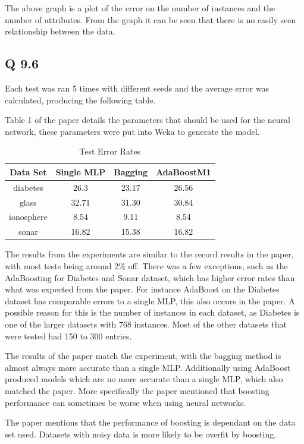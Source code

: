The above graph is a plot of the error on the number of instances and the number of attributes.
From the graph it can be seen that there is no easily seen relationship between the data.

\subsection*{Q 9.6}

Each test was ran 5 times with different seeds and the average error was calculated, producing the following table.

Table 1 of the paper details the parameters that should be used for the neural network,
these parameters were put into Weka to generate the model.

\begin{table}[H]
\centering
\caption{Test Error Rates}
\begin{tabular}{|c|c|c|c|}
\hline
Data Set & Single MLP & Bagging & AdaBoostM1 \\
\hline
diabetes & 26.3 & 23.17 & 26.56 \\
glass & 32.71 & 31.30 & 30.84 \\
ionosphere & 8.54 & 9.11 & 8.54 \\
sonar & 16.82 & 15.38 & 16.82 \\
\hline
\end{tabular}
\end{table}

The results from the experiments are similar to the record results in the paper, with most tests being around 2\% off.
There was a few exceptions, such as the AdaBoosting for Diabetes and Sonar dataset,
which has higher error rates than what was expected from the paper.
For instance AdaBoost on the Diabetes dataset has comparable errors to a single MLP, this also occurs in the paper.
A possible reason for this is the number of instances in each dataset, as Diabetes is one of the larger datasets
with 768 instances.
Most of the other datasets that were tested had 150 to 300 entries.

The results of the paper match the experiment, with the bagging method is almost always more accurate than a single MLP.
Additionally using AdaBoost produced models which are no more accurate than a single MLP, which also matched the paper.
More specifically the paper mentioned that boosting performance can sometimes be worse when using neural networks.

The paper mentions that the performance of boosting is dependant on the data set used.
Datasets with noisy data is more likely to be overfit by boosting.


